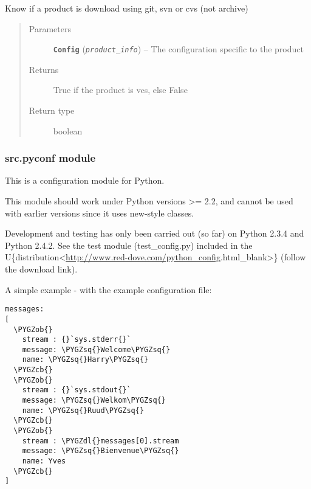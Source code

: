\documentclass[a4paper,10pt,english]{sphinxmanual}
\def\PYGZob{\char`\{}
\def\PYGZcb{\char`\}}
\def\PYGZdl{\char`\$}
\def\PYGZsq{\char`\'}
\renewcommand\PYGZsq{\textquotesingle}
\begin{document}
\begin{fulllineitems}
\label{commands/apidoc/src:src.product.product_is_vcs}
Know if a product is download using git, svn or cvs (not archive)
\begin{quote}\begin{description}
\item[{Parameters}] \leavevmode
\textbf{\texttt{Config}} (\emph{\texttt{product\_info}}) -- The configuration specific to 
the product

\item[{Returns}] \leavevmode
True if the product is vcs, else False

\item[{Return type}] \leavevmode
boolean

\end{description}\end{quote}

\end{fulllineitems}



\subsubsection{src.pyconf module}
\label{commands/apidoc/src:src-pyconf-module}\label{commands/apidoc/src:module-src.pyconf}
This is a configuration module for Python.

This module should work under Python versions \textgreater{}= 2.2, and cannot be used with
earlier versions since it uses new-style classes.

Development and testing has only been carried out (so far) on Python 2.3.4 and
Python 2.4.2. See the test module (test\_config.py) included in the
U\{distribution\textless{}\url{http://www.red-dove.com/python\_config}.html\textbar{}\_blank\textgreater{}\} (follow the
download link).

A simple example - with the example configuration file:

\begin{Verbatim}[commandchars=\\\{\}]
messages:
[
  \PYGZob{}
    stream : {}`sys.stderr{}`
    message: \PYGZsq{}Welcome\PYGZsq{}
    name: \PYGZsq{}Harry\PYGZsq{}
  \PYGZcb{}
  \PYGZob{}
    stream : {}`sys.stdout{}`
    message: \PYGZsq{}Welkom\PYGZsq{}
    name: \PYGZsq{}Ruud\PYGZsq{}
  \PYGZcb{}
  \PYGZob{}
    stream : \PYGZdl{}messages[0].stream
    message: \PYGZsq{}Bienvenue\PYGZsq{}
    name: Yves
  \PYGZcb{}
]
\end{Verbatim}
\end{document}
